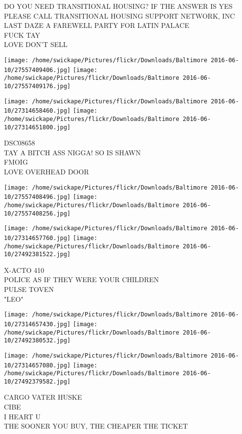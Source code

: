 \documentclass[10pt,letterpaper]{article}
\begin{document}
DO YOU NEED TRANSITIONAL HOUSING?  IF THE ANSWER IS YES PLEASE CALL TRANSITIONAL HOUSING SUPPORT NETWORK, INC\\
LAST DAZE A FAREWELL PARTY FOR LATIN PALACE\\
FUCK TAY\\
LOVE DON'T SELL
\pagebreak

\texttt{[image: /home/swickape/Pictures/flickr/Downloads/Baltimore 2016-06-10/27557409406.jpg]}
\texttt{[image: /home/swickape/Pictures/flickr/Downloads/Baltimore 2016-06-10/27557409176.jpg]}

\texttt{[image: /home/swickape/Pictures/flickr/Downloads/Baltimore 2016-06-10/27314658460.jpg]}
\texttt{[image: /home/swickape/Pictures/flickr/Downloads/Baltimore 2016-06-10/27314651800.jpg]}

DSC08658\\
TAY A BITCH ASS NIGGA!  SO IS SHAWN\\
FMOIG\\
LOVE OVERHEAD DOOR
\pagebreak

\texttt{[image: /home/swickape/Pictures/flickr/Downloads/Baltimore 2016-06-10/27557408496.jpg]}
\texttt{[image: /home/swickape/Pictures/flickr/Downloads/Baltimore 2016-06-10/27557408256.jpg]}

\texttt{[image: /home/swickape/Pictures/flickr/Downloads/Baltimore 2016-06-10/27314657760.jpg]}
\texttt{[image: /home/swickape/Pictures/flickr/Downloads/Baltimore 2016-06-10/27492381522.jpg]}

X{-}ACTO 410\\
POLICE AS IF THEY WERE YOUR CHILDREN\\
PULSE TOVEN\\
"LEO"
\pagebreak

\texttt{[image: /home/swickape/Pictures/flickr/Downloads/Baltimore 2016-06-10/27314657430.jpg]}
\texttt{[image: /home/swickape/Pictures/flickr/Downloads/Baltimore 2016-06-10/27492380532.jpg]}

\texttt{[image: /home/swickape/Pictures/flickr/Downloads/Baltimore 2016-06-10/27314657080.jpg]}
\texttt{[image: /home/swickape/Pictures/flickr/Downloads/Baltimore 2016-06-10/27492379582.jpg]}

CARGO VATER HUSKE\\
CIBE\\
I HEART U\\
THE SOONER YOU BUY, THE CHEAPER THE TICKET
\pagebreak
\end{document}
